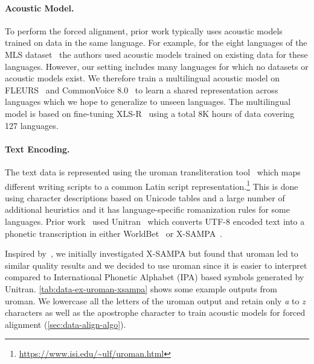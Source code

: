 \paragraph{Acoustic Model.}
To perform the forced alignment, prior work typically uses acoustic models trained on data in the same language.
For example, for the eight languages of the MLS dataset~\cite{pratap2020mls} the authors used acoustic models trained on existing data for these languages.
However, our setting includes many languages for which no datasets or acoustic models exist.
We therefore train a multilingual acoustic model on FLEURS~\citep{conneau2022fleurs} and CommonVoice 8.0~\citep{ardila2019common} to learn a shared representation across languages which we hope to generalize to unseen languages. 
The multilingual model is based on fine-tuning XLS-R~\citep{babu22_interspeech} using a total 8K hours of data covering 127 languages.

\insertUromanXsampaExamples

\paragraph{Text Encoding.}
The text data is represented using the uroman transliteration tool~\citep{hermjakob-etal-2018-box}
which maps different writing scripts to a common Latin script representation.\footnote{\url{https://www.isi.edu/~ulf/uroman.html}}
This is done using character descriptions based on Unicode tables and a large number of additional heuristics and it has language-specific romanization rules for some languages.
Prior work~\citep{black2019cmu} used Unitran~\citep{yoon-etal-2007-multilingual,qian-etal-2010-python,black2019cmu} which converts UTF-8 encoded text into a phonetic transcription in either WorldBet~\citep{hieronymus1993ascii} or X-SAMPA~\citep{wells_1995}. 

Inspired by~\citet{black2019cmu}, we initially investigated X-SAMPA but found that uroman led to similar quality results and we decided to use uroman since it is easier to interpret compared to International Phonetic Alphabet (IPA) based symbols generated by Unitran. 
\autoref{tab:data-ex-uroman-xsampa} shows some example outputs from uroman. 
We lowercase all the letters of the uroman output and retain only \textit{a} to \textit{z} characters as well as the apostrophe character to train acoustic models for forced alignment (\autoref{sec:data-align-algo}).




